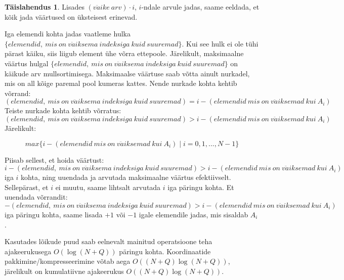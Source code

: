 \documentclass{trkut}
\theoremstyle{definition}
\newtheorem*{solution}{Täislahendus}
\begin{document}
\begin{solution}
Lisades $(v\ddot{a}ike\ arv)\cdot i$, $i$-ndale arvule jadas, saame eeldada, et kõik jada väärtused on üksteisest erinevad.

Iga elemendi kohta jadas vaatleme hulka $\{elemendid,\ mis\ on\ v\ddot{a}iksema\ indeksiga\ kuid\ suuremad\}$. Kui see hulk ei ole tühi pärast käiku, siis liigub element ühe võrra ettepoole. Järelikult, maksimaalne väärtus hulgal $\{elemendid,\ mis\ on\ v\ddot{a}iksema\ indeksiga\ kuid\ suuremad\}$ on käikude arv mullsortimisega. Maksimaalse väärtuse saab võtta ainult nurkadel, mis on all kõige paremal pool kumeras kattes. Nende nurkade kohta kehtib võrrand:
\[(elemendid,\ mis\ on\ v\ddot{a} iksema\ indeksiga\ kuid\ suuremad)=i-(elemendid\ mis\ on\ v\ddot{a} iksemad\ kui\ A_i)\]
Teiste nurkade kohta kehtib võrratus:
\[(elemendid,\ mis\ on\ v\ddot{a}iksema\ indeksiga\ kuid\ suuremad)>i-(elemendid\ mis\ on\ v\ddot{a}iksemad\ kui\ A_i)\]
Järelikult:

\[max\{i-(elemendid\ mis\ on\ v\ddot{a}iksemad\ kui\ A_i)\mid i=0,1,...,N-1\}\]

Piisab sellest, et hoida väärtust:
\[i-(elemendid,\ mis\ on\ v\ddot{a}iksema\ indeksiga\ kuid\ suuremad)>i-(elemendid\ mis\ on\ v\ddot{a}iksemad\ kui\ A_i)\]
iga $i$ kohta, ning uuendada ja arvutada maksimaalne väärtus efektiivselt. Sellepärast, et $i$ ei muutu, saame lihtsalt arvutada $i$ iga päringu kohta. Et uuendada võrrandit:
\[-(elemendid,\ mis\ on\ v\ddot{a}iksema\ indeksiga\ kuid\ suuremad)>i-(elemendid\ mis\ on\ v\ddot{a}iksemad\ kui\ A_i)\]
iga päringu kohta, saame lisada $+1$ või $-1$ igale elemendile jadas, mis sisaldab $A_i$.

Kasutades lõikude puud saab eelnevalt mainitud operatsioone teha ajakeerukusega $O(\log (N+Q))$ päringu kohta. Koordinaatide pakkimine/kompresseerimine võtab aega $O((N+Q)\log (N+Q))$, järelikult on kumulatiivne ajakeerukus $O((N+Q)\log (N+Q))$.\parencite{JOIS}
\end{solution}
\end{document}
